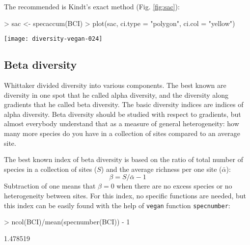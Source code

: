\documentclass[a4paper,10pt]{amsart}
\begin{document}
The recommended is Kindt's exact method (Fig. \ref{fig:sac}):
\begin{Schunk}
\begin{Sinput}
> sac <- specaccum(BCI)
> plot(sac, ci.type = "polygon", ci.col = "yellow")
\end{Sinput}
\end{Schunk}
\begin{SCfigure}
\texttt{[image: diversity-vegan-024]}
\caption{Species accumulation curve for the BCI data; exact method.}
\label{fig:sac}
\end{SCfigure}

\subsection{Beta diversity}

Whittaker divided diversity into various components. The best known
are diversity in one spot that he called alpha diversity, and the
diversity along gradients that he called beta diversity. The basic
diversity indices are indices of alpha diversity. Beta diversity
should be studied with respect to gradients, but almost everybody
understand that as a measure of general heterogeneity: how many more
species do you have in a collection of sites compared to an average
site.

The best known index of beta diversity is based on the ratio of total
number of species in a collection of sites ($S$) and the average
richness per one site ($\bar \alpha$):
\begin{equation}
  \label{eq:beta}
  \beta = S/\bar \alpha - 1
\end{equation}
Subtraction of one means that $\beta = 0$ when there are no excess
species or no heterogeneity between sites. For this index, no specific
functions are needed, but this index can be easily found with the help
of \texttt{vegan} function \texttt{specnumber}:
\begin{Schunk}
\begin{Sinput}
> ncol(BCI)/mean(specnumber(BCI)) - 1
\end{Sinput}
\begin{Soutput}
[1] 1.478519
\end{Soutput}
\end{Schunk}
\end{document}

